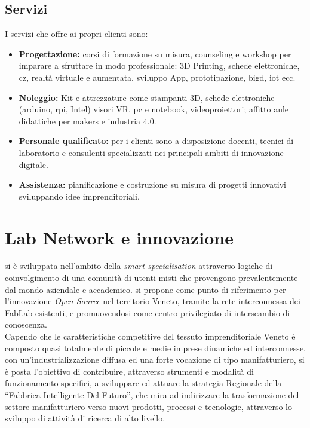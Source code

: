 \subsection{Servizi}
I servizi che \lab{} offre ai propri clienti sono:
\begin{itemize}
\item \textbf{Progettazione:} corsi di formazione su misura, \gls{counseling} e \gls{workshop} per imparare a sfruttare in modo professionale: 3D Printing, schede elettroniche, \gls{cz}, realtà virtuale e aumentata, sviluppo App, prototipazione, \gls{bigd}, \gls{iot} ecc.
\item \textbf{Noleggio:} Kit e attrezzature come stampanti 3D, schede elettroniche (\gls{arduino}, \gls{rpi}, Intel) visori VR, pc e notebook, videoproiettori; affitto aule didattiche per \gls{makers} e industria 4.0.
\item \textbf{Personale qualificato:} per i clienti sono a disposizione docenti, tecnici di laboratorio e consulenti specializzati nei principali ambiti di innovazione digitale.
\item \textbf{Assistenza:} pianificazione e costruzione su misura di progetti innovativi sviluppando idee imprenditoriali.
\end{itemize}

\section{Lab Network e innovazione}
\lab{} si è sviluppata nell’ambito della \textit{smart specialisation} attraverso logiche di coinvolgimento di una comunità di utenti misti che provengono prevalentemente dal mondo aziendale e accademico. 
\lab{} si propone come punto di riferimento per l’innovazione \textit{Open Source} nel territorio Veneto, tramite la rete interconnessa dei \gls{FabLab} esistenti, e promuovendosi come centro privilegiato di interscambio di conoscenza.\\
Capendo che le caratteristiche competitive del tessuto imprenditoriale Veneto è composto quasi totalmente di piccole e medie imprese dinamiche ed interconnesse, con un’industrializzazione diffusa ed una forte vocazione di tipo manifatturiero, \lab{} si è posta l’obiettivo di contribuire, attraverso strumenti e modalità di funzionamento specifici, a sviluppare ed attuare la strategia Regionale della ``Fabbrica Intelligente Del Futuro'', che mira ad indirizzare la trasformazione del settore manifatturiero verso nuovi prodotti, processi e tecnologie, attraverso lo sviluppo di attività di ricerca di alto livello.

